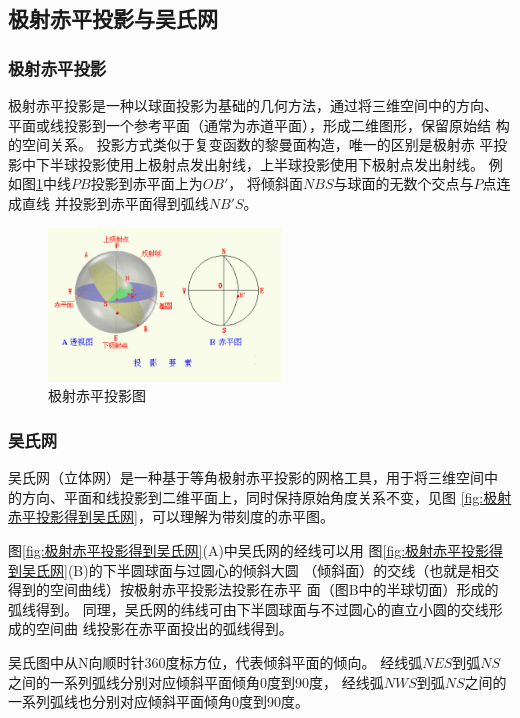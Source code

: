 \documentclass[a4paper,twoside]{ctexart}
\begin{document}
\subsection{极射赤平投影与吴氏网}

\subsubsection{极射赤平投影}
极射赤平投影是一种以球面投影为基础的几何方法，通过将三维空间中的方向、
平面或线投影到一个参考平面（通常为赤道平面），形成二维图形，保留原始结
构的空间关系。 投影方式类似于复变函数的黎曼面构造，唯一的区别是极射赤
平投影中下半球投影使用上极射点发出射线，上半球投影使用下极射点发出射线。
例如图\ref{fig:极射赤平投影图}中线$PB$投影到赤平面上为$OB'$，
将倾斜面$NBS$与球面的无数个交点与$P$点连成直线
并投影到赤平面得到弧线$NB'S$。   

\begin{figure}[htbp]
  \centering
    \includegraphics[width=0.55\textwidth]{pic/级射赤平投影图.png}
  \caption{极射赤平投影图}
  \label{fig:极射赤平投影图}
\end{figure}

\subsubsection{吴氏网}

吴氏网（立体网）是一种基于等角极射赤平投影的网格工具，用于将三维空间中
的方向、平面和线投影到二维平面上，同时保持原始角度关系不变，见图
\ref{fig:极射赤平投影得到吴氏网}，可以理解为带刻度的赤平图。

图\ref{fig:极射赤平投影得到吴氏网}(A)中吴氏网的经线可以用
图\ref{fig:极射赤平投影得到吴氏网}(B)的下半圆球面与过圆心的倾斜大圆
（倾斜面）的交线（也就是相交得到的空间曲线）按极射赤平投影法投影在赤平
面（图B中的半球切面）形成的弧线得到。 
同理，吴氏网的纬线可由下半圆球面与不过圆心的直立小圆的交线形成的空间曲
线投影在赤平面投出的弧线得到。

吴氏图中从N向顺时针360度标方位，代表倾斜平面的倾向。
经线弧$NES$到弧$NS$之间的一系列弧线分别对应倾斜平面倾角0度到90度，
经线弧$NWS$到弧$NS$之间的一系列弧线也分别对应倾斜平面倾角0度到90度。
\end{document}
